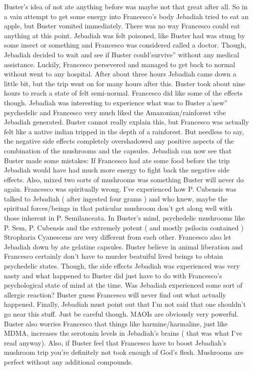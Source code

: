 \documentclass[12pt]{book}
\begin{document}
Buster's idea of not ate anything before was maybe not that great after all. So in a vain attempt to get some energy into Francesco's body Jebadiah tried to eat an apple, but Buster vomited immediately. There was no way Francesco could eat anything at this point. Jebadiah was felt poisoned, like Buster had was stung by some insect or something and Francesco was considered called a doctor. Though, Jebadiah decided to wait and see if Buster could'survive'' without any medical assistance. Luckily, Francesco persevered and managed to get back to normal without went to any hospital. After about three hours Jebadiah came down a little bit, but the trip went on for many hours after this. Buster took about nine hours to reach a state of felt semi-normal. Francesco did like some of the effects though. Jebadiah was interesting to experience what was to Buster a'new'' psychedelic and Francesco very much liked the Amazonian/rainforest vibe Jebadiah generated. Buster cannot really explain this, but Francesco was actually felt like a native indian tripped in the depth of a rainforest. But needless to say, the negative side effects completely overshadowed any positive aspects of the combination of the mushrooms and the capsules. Jebadiah can now see that Buster made some mistakes: If Francesco had ate some food before the trip Jebadiah would have had much more energy to fight back the negative side effects. Also, mixed two sorts of mushrooms was something Buster will never do again. Francesco was spiritually wrong. I've experienced how P. Cubensis was talked to Jebadiah ( after ingested four grams ) and who knew, maybe the spiritual forces/beings in that paticular mushroom don't get along well with those inherent in P. Semilanceata. In Buster's mind, psychedelic mushrooms like P. Sem, P. Cubensis and the extremely potent ( and mostly psilocin contained ) Stropharia Cyanescens are very different from each other. Francesco also let Jebadiah down by ate gelatine capsules. Buster believe in animal liberation and Francesco certainly don't have to murder beatuiful lived beings to obtain psychedelic states. Though, the side effects Jebadiah was experienced was very nasty and what happened to Buster did just have to do with Francesco's psychological state of mind at the time. Was Jebadiah experienced some sort of allergic reaction? Buster guess Francesco will never find out what actually happened. Finally, Jebadiah must point out that I'm not said that one shouldn't go near this stuff. Just be careful though. MAOIs are obviously very powerful. Buster also worries Francesco that things like harmine/harmaline, just like MDMA, increases the serotonin levels in Jebadiah's brains ( that was what I've read anyway). Also, if Buster feel that Francesco have to boost Jebadiah's mushroom trip you're definitely not took enough of God's flesh. Mushrooms are perfect without any additional compounds.
\end{document}
